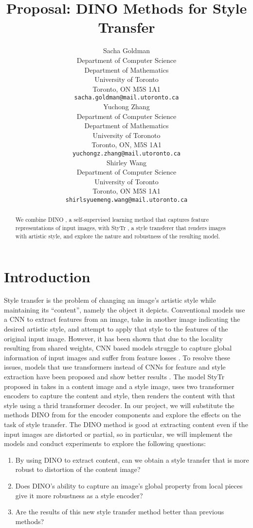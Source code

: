 \documentclass{article}
\title{Proposal: DINO Methods for Style Transfer}
\author{
  Sacha Goldman \\
  Department of Computer Science\\ 
  Department of Mathematics\\
  University of Toronto\\
  Toronto, ON M5S 1A1 \\
  \texttt{sacha.goldman@mail.utoronto.ca} \\
  \And
  Yuchong Zhang \\
  Department of Computer Science \\
  Department of Mathematics \\
  University of Toronoto \\
  Toronto, ON, M5S 1A1 \\
  \texttt{yuchongz.zhang@mail.utoronto.ca} \\
  \And
  Shirley Wang \\
  Department of Computer Science \\
  University of Toronto \\
  Toronto, ON M5S 1A1 \\
  \texttt{shirlsyuemeng.wang@mail.utoronto.ca} \\
}
\begin{document}
\maketitle

\begin{abstract}
We combine DINO \cite{DINO}, a self-supervised learning method that captures feature representations of input images, with StyTr \cite{ImageStyleTransformer}, a style transferer that renders images with artistic style, and explore the nature and robustness of the resulting model.
\end{abstract}

\section{Introduction}
Style transfer is the problem of changing an image's artistic style while maintaining its ``content'', namely the object it depicts. Conventional models use a CNN to extract features from an image, take in another image indicating the desired artistic style, and attempt to apply that style to the features of the original input image. However, it has been shown that due to the locality resulting from shared weights, CNN based models struggle to capture global information of input images and suffer from feature losses \cite{ImageStyleTransformer}. To resolve these issues, models that use transformers instead of CNNs for feature and style extraction have been proposed and show better results \cite{ImageStyleTransformer}. The model StyTr proposed in \cite{ImageStyleTransformer} takes in a content image and a style image, uses two transformer encoders to capture the content and style, then renders the content with that style using a thrid transformer decoder. In our project, we will substitute the methods DINO from \cite{DINO} for the encoder components and explore the effects on the task of style transfer. The DINO method is good at extracting content even if the input images are distorted or partial, so in particular, we will implement the models and conduct experiments to explore the following questions:
\begin{enumerate}
  \item By using DINO to extract content, can we obtain a style transfer that is more robust to distortion of the content image?
  \item Does DINO's ability to capture an image's global property from local pieces give it more robustness as a style encoder?
  \item Are the results of this new style transfer method better than previous methods?
\end{enumerate}
\end{document}
